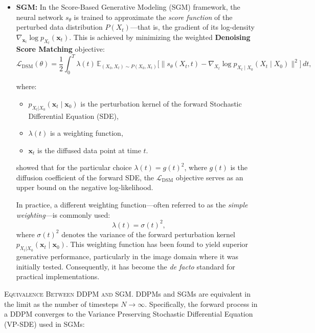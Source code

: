 \begin{itemize}
    \item \textbf{SGM:} In the Score-Based Generative Modeling (SGM) framework, the neural network \(s_\theta\) is trained to approximate the \emph{score function} of the perturbed data distribution \(P(X_t)\)—that is, the gradient of its log-density \(\nabla_{\mathbf{x}_t} \log p_{X_t}(\mathbf{x}_t)\). This is achieved by minimizing the weighted \textbf{Denoising Score Matching} objective:
        \[
        \mathcal{L}_{\text{DSM}}(\theta) = \frac{1}{2} \int_0^T \lambda(t) \, \mathbb{E}_{(X_0, X_t) \sim P(X_0, X_t)} \bigl[ \bigl\| s_\theta(X_t, t) - \nabla_{X_t} \log p_{X_t \mid X_0}(X_t \mid X_0) \bigr\|^2 \bigr] \, dt,
        \]

        where:
        \begin{itemize}
            \item \( p_{X_t|X_0}(\mathbf{x}_t \mid \mathbf{x}_0) \) is the perturbation kernel of the forward Stochastic Differential Equation (SDE),
            \item \( \lambda(t) \) is a weighting function,
            \item \( \mathbf{x}_t \) is the diffused data point at time \( t \).
        \end{itemize}

        \citet{song2021maximum} showed that for the particular choice \( \lambda(t) = g(t)^2 \), where \( g(t) \) is the diffusion coefficient of the forward SDE, the \( \mathcal{L}_{\text{DSM}} \) objective serves as an upper bound on the negative log-likelihood.

        In practice, a different weighting function—often referred to as the \emph{simple weighting}—is commonly used:
        \[
        \lambda(t) = \sigma(t)^2,
        \]
        where \( \sigma(t)^2 \) denotes the variance of the forward perturbation kernel \( p_{X_t|X_0}(\mathbf{x}_t \mid \mathbf{x}_0) \). This weighting function has been found to yield superior generative performance, particularly in the image domain where it was initially tested. Consequently, it has become the \emph{de facto} standard for practical implementations.

\end{itemize}

\textsc{Equivalence Between DDPM and SGM.} DDPMs and SGMs are equivalent in the limit as the number of timesteps \( N \to \infty \). Specifically, the forward process in a DDPM converges to the Variance Preserving Stochastic Differential Equation (VP-SDE) used in SGMs:


